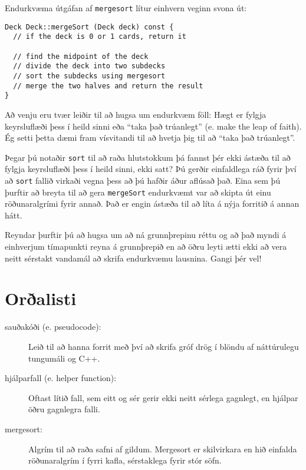 Endurkvæma útgáfan af {\tt mergesort} lítur einhvern veginn svona út: 

\begin{verbatim}
Deck Deck::mergeSort (Deck deck) const {
  // if the deck is 0 or 1 cards, return it

  // find the midpoint of the deck
  // divide the deck into two subdecks
  // sort the subdecks using mergesort
  // merge the two halves and return the result
}
\end{verbatim}
%
Að venju eru tvær leiðir til að hugsa um endurkvæm föll:
Hægt er fylgja keyrsluflæði þess í heild sinni eða ``taka það trúanlegt'' (e. make the leap of faith).
Ég setti þetta dæmi fram vísvitandi til að hvetja þig til að ``taka það trúanlegt''.


Þegar þú notaðir {\tt sort} til að raða hlutstokkum þá fannst þér ekki ástæða til að fylgja keyrsluflæði þess í heild sinni, ekki satt?
Þú gerðir einfaldlega ráð fyrir því að {\tt sort} fallið virkaði vegna þess að þú hafðir áður aflúsað það. 
Eina sem þú þurftir að breyta til að gera {\tt mergeSort} endurkvæmt var að skipta út einu röðunaralgrími fyrir annað. 
Það er engin ástæða til að líta á nýja forritið á annan hátt. 

Reyndar þurftir þú að hugsa um að ná grunnþrepinu réttu og að það myndi á einhverjum tímapunkti reyna á grunnþrepið en að öðru leyti ætti ekki að vera neitt sérstakt vandamál að skrifa endurkvæmu lausnina.  Gangi þér vel!

\section{Orðalisti}

\begin{description}

\item[sauðakóði (e. pseudocode):]  Leið til að hanna forrit með því að skrifa gróf drög í blöndu af náttúrulegu tungumáli og C++.

\item[hjálparfall (e. helper function):]  Oftast lítið fall, sem eitt og sér gerir ekki neitt sérlega gagnlegt, en hjálpar öðru gagnlegra falli.


\item[mergesort:]  Algrím til að raða safni af gildum.
Mergesort er skilvirkara en hið einfalda röðunaralgrím í fyrri kafla, sérstaklega fyrir stór söfn. 



\end{description}


